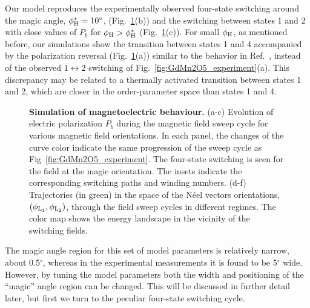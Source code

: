 Our model reproduces the experimentally observed four-state switching around the magic angle, $\phi_{\rm H}^\ast  = 10^\circ$, (Fig.~\ref{fig:GdMn2O5_theory}(b)) and the switching between states 1 and 2 with close values of $P_b$ for $\phi_{\rm H} > \phi_{\rm H}^\ast$  (Fig.~\ref{fig:GdMn2O5_theory}(c)).
For small $\phi_{\rm H}$, as mentioned before, our simulations show the transition between states 1 and 4 accompanied by the polarization reversal (Fig.~\ref{fig:GdMn2O5_theory}(a)) similar to the behavior in Ref.~\cite{Lee13}, instead of the observed $1\leftrightarrow2$ switching of Fig.~\ref{fig:GdMn2O5_experiment}(a). 
This discrepancy may be related to a thermally activated transition between states 1 and 2, which are closer in the order-parameter space than states 1 and 4.
\begin{figure}[b!]
    \caption{\label{fig:GdMn2O5_theory}{\bf Simulation of magnetoelectric behaviour.}
    (a-c) Evolution of electric polarization $P_b$ during the magnetic field sweep cycle for various magnetic field orientations. 
   In each panel, the changes of the curve color indicate the same progression of the sweep cycle as Fig~\ref{fig:GdMn2O5_experiment}. The four-state switching is seen for the field at the magic orientation. 
    The insets indicate the corresponding switching paths and winding numbers.
    (d-f) Trajectories (in green) in the space of the N\'eel vectors orientations, $(\phi_{\rm L_1},\phi_{\rm L_2})$, through the field sweep cycles in different regimes. The color map shows the energy landscape in the vicinity of the switching fields. 
}
\end{figure}

The magic angle region for this set of model parameters is relatively narrow, about 0.5$^\circ$, whereas in the experimental measurements it is found to be 5$^\circ$ wide.
However, by tuning the model parameters both the width and positioning of the ``magic'' angle region can be changed.
This will be discussed in further detail later, but first we turn to the peculiar four-state switching cycle.

